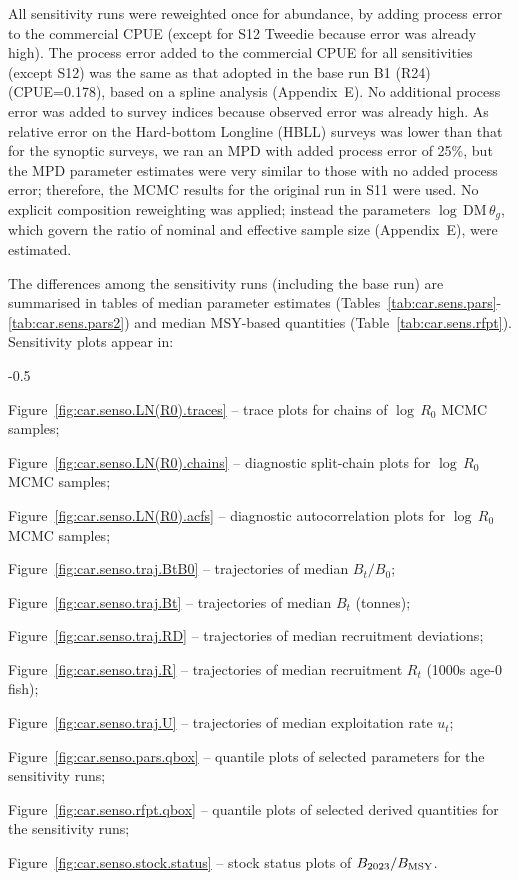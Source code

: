 \documentclass[11pt]{book}
\newcommand{\Bmsy}{B_\text{MSY}}
\newcommand{\AppEqn}{Appendix~E}
\newcommand{\pc}{\%}
\begin{document}
All sensitivity runs were reweighted once for abundance, by adding process error to the commercial CPUE (except for S12 Tweedie because error was already high). 
The process error added to the commercial CPUE for all sensitivities (except S12) was the same as that adopted in the base run B1 (R24) (CPUE=0.178), based on a spline analysis (\AppEqn).
No additional process error was added to survey indices because observed error was already high.
As relative error on the Hard-bottom Longline (HBLL) surveys was lower than that for the synoptic surveys, we ran an MPD with added process error of 25\pc{}, but the MPD parameter estimates were very similar to those with no added process error; therefore, the MCMC results for the original run in S11 were used.
No explicit composition reweighting was applied; instead the parameters $\log\,\text{DM}\,\theta_g$, which govern the ratio of nominal and effective sample size (\AppEqn), were estimated.

The differences among the sensitivity runs (including the base run) are summarised in tables of median parameter estimates (Tables~\ref{tab:car.sens.pars}-\ref{tab:car.sens.pars2}) and median MSY-based quantities (Table~\ref{tab:car.sens.rfpt}).
Sensitivity plots appear in:
\begin{itemize_csas}{-0.5}{}
  \item Figure~\ref{fig:car.senso.LN(R0).traces} -- trace plots for chains of $\log\,R_0$ MCMC samples;
  \item Figure~\ref{fig:car.senso.LN(R0).chains} -- diagnostic split-chain plots for $\log\,R_0$ MCMC samples;
  \item Figure~\ref{fig:car.senso.LN(R0).acfs} -- diagnostic autocorrelation plots for $\log\,R_0$ MCMC samples;
  \item Figure~\ref{fig:car.senso.traj.BtB0} -- trajectories of median $B_t/B_0$;
  \item Figure~\ref{fig:car.senso.traj.Bt} -- trajectories of median $B_t$ (tonnes);
  \item Figure~\ref{fig:car.senso.traj.RD} -- trajectories of median recruitment deviations;
  \item Figure~\ref{fig:car.senso.traj.R} -- trajectories of median recruitment $R_t$ (1000s age-0 fish);
  \item Figure~\ref{fig:car.senso.traj.U} -- trajectories of median exploitation rate $u_t$;
  \item Figure~\ref{fig:car.senso.pars.qbox} -- quantile plots of selected parameters for the sensitivity runs;
  \item Figure~\ref{fig:car.senso.rfpt.qbox} -- quantile plots of selected derived quantities for the sensitivity runs;
  \item Figure~\ref{fig:car.senso.stock.status} -- stock status plots of $B_{\currYear}/\Bmsy$.
 \end{itemize_csas}
\end{document}
